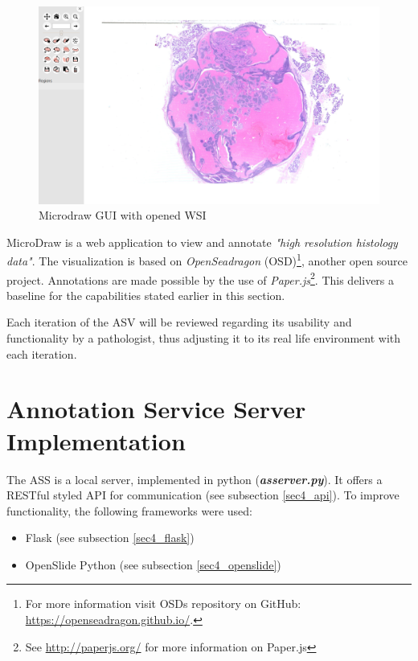 \begin{figure}[H]
	\begin{center}
		\includegraphics[scale=0.2]{img/microdrawUI.png}
		\caption{Microdraw GUI with opened WSI}
		\label{fig4_microdrawUI}
	\end{center}
\end{figure}

MicroDraw is a web application to view and annotate \emph{"high resolution histology data"}\cite{web:microdraw2}. The visualization is based on \emph{OpenSeadragon} (OSD)\footnote{
	For more information visit OSDs repository on GitHub: \url{https://openseadragon.github.io/}.
}, another open source project. Annotations are made possible by the use of \emph{Paper.js}\footnote{See \url{http://paperjs.org/} for more information on Paper.js}. This delivers a baseline for the capabilities stated earlier in this section.

Each iteration of the ASV will be reviewed regarding its usability and functionality by a pathologist, thus adjusting it to its real life environment with each iteration.


\section{Annotation Service Server Implementation}
The ASS is a local server, implemented in python (\emph{\textbf{as{\textunderscore}server.py}}). It offers a RESTful styled API for communication (see subsection \ref{sec4_api}). To improve functionality, the following frameworks were used:

\begin{itemize}
	\item Flask (see subsection \ref{sec4_flask})
	\item OpenSlide Python (see subsection \ref{sec4_openslide})
\end{itemize}

